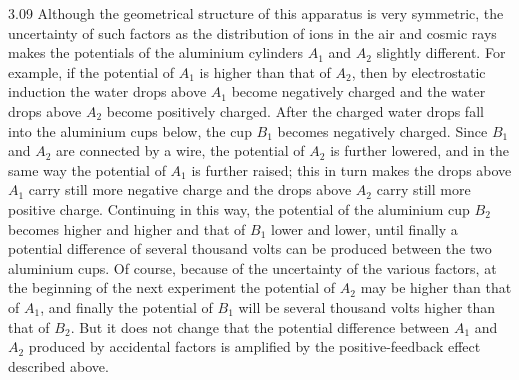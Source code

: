 \begin{solution}{3.09}
Although the geometrical structure of this apparatus is very symmetric, the uncertainty of such factors as the distribution of ions in the air and cosmic rays makes the potentials of the aluminium cylinders $A_1$ and $A_2$ slightly different. For example, if the potential of $A_1$ is higher than that of $A_2$, then by electrostatic induction the water drops above $A_1$ become negatively charged and the water drops above $A_2$ become positively charged. After the charged water drops fall into the aluminium cups below, the cup $B_1$ becomes negatively charged. Since $B_1$ and $A_2$ are connected by a wire, the potential of $A_2$ is further lowered, and in the same way the potential of $A_1$ is further raised; this in turn makes the drops above $A_1$ carry still more negative charge and the drops above $A_2$ carry still more positive charge. Continuing in this way, the potential of the aluminium cup $B_2$ becomes higher and higher and that of $B_1$ lower and lower, until finally a potential difference of several thousand volts can be produced between the two aluminium cups. Of course, because of the uncertainty of the various factors, at the beginning of the next experiment the potential of $A_2$ may be higher than that of $A_1$, and finally the potential of $B_1$ will be several thousand volts higher than that of $B_2$. But it does not change that the potential difference between $A_1$ and $A_2$ produced by accidental factors is amplified by the positive-feedback effect described above.
\end{solution}

